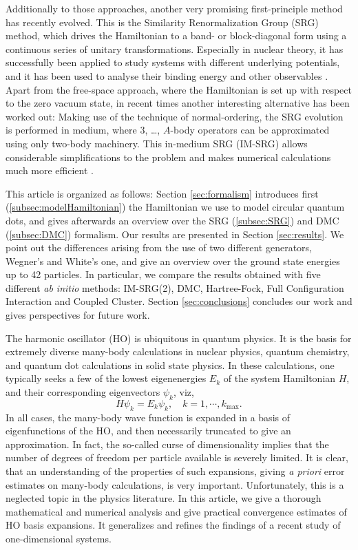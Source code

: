 \documentclass[amsmath, amssymb, aps, floatfix, nofootinbib, preprintnumbers,showpacs, superscriptaddress, twocolumn]{revtex4-1}
\begin{document}
Additionally to those approaches, another very promising first-principle
method has recently evolved. This is the Similarity Renormalization Group
(SRG) method, which drives the Hamiltonian to a band- or block-diagonal form
using a continuous series of unitary transformations.  Especially in nuclear
theory, it has successfully been applied to study systems with different
underlying potentials, and it has been used to analyse their binding energy
and other observables \cite{ScottSRG,PhysRevC.75.061001,SRGThreeDim}. Apart
from the free-space approach, where the Hamiltonian is set up with respect to
the zero vacuum state, in recent times another interesting alternative has
been worked out: Making use of the technique of normal-ordering, the SRG
evolution is performed in medium, where 3, \ldots, $A$-body operators can be
approximated using only two-body machinery. This in-medium SRG (IM-SRG) allows
considerable simplifications to the problem and makes numerical calculations
much more efficient \cite{IMSRG}.

 This article is organized as follows: Section \ref{sec:formalism}
 introduces first (\ref{subsec:modelHamiltonian}) the Hamiltonian we
 use to model circular quantum dots, and gives afterwards an overview
 over the SRG (\ref{subsec:SRG}) and DMC (\ref{subsec:DMC})
 formalism. Our results are presented in Section \ref{sec:results}. We
 point out the differences arising from the use of two different
 generators, Wegner's and White's one, and give an overview over the
 ground state energies up to 42 particles. In particular, we compare
 the results obtained with five different \textit{ab initio} methods:
 IM-SRG(2), DMC, Hartree-Fock, Full Configuration Interaction and
 Coupled Cluster. Section \ref{sec:conclusions} concludes our work and
 gives perspectives for future work.

The harmonic oscillator (HO) is ubiquitous in quantum physics. It is
the basis for extremely diverse many-body calculations in nuclear
physics,\cite{HjorthJensen1995} quantum chemistry,\cite{Helgaker2002}
and quantum dot calculations in solid state physics.\cite{Reimann2002}
In these calculations, one typically seeks a few of the lowest
eigenenergies $E_k$ of the system Hamiltonian $H$, and their
corresponding eigenvectors $\psi_k$, viz,
\[ H\psi_k = E_k\psi_k, \quad k = 1,\cdots,k_\text{max}. \] In all
cases, the many-body wave function is expanded in a basis of
eigenfunctions of the HO, and then necessarily truncated to give an
approximation. In fact, the so-called curse of dimensionality implies
that the number of degrees of freedom per particle available is
severely limited. It is clear, that an understanding of the properties
of such expansions, giving \emph{a priori} error estimates on
many-body calculations, is very important. Unfortunately, this is a
neglected topic in the physics literature. In this article, we give a
thorough mathematical and numerical analysis and give practical
convergence estimates of HO basis expansions. It generalizes and
refines the findings of a recent study of one-dimensional systems.\cite{Kvaal2007}
\end{document}
